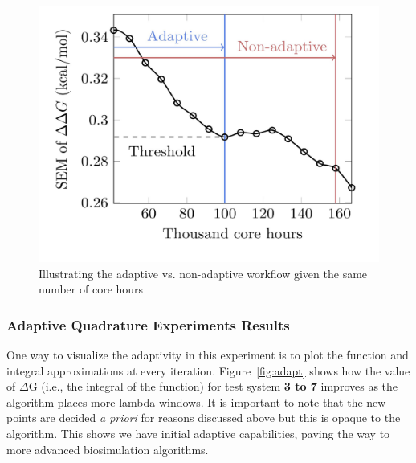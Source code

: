 
\begin{figure}
  \centering
    \includegraphics[width=\columnwidth]{figures/adaptive_vs_nonadaptive_pseudo.pdf}
    \caption{Illustrating the adaptive vs. non-adaptive workflow given the
    same number of core hours}
\label{fig:adaptive_vs_nonadaptive_TIES}
\end{figure}

\subsubsection{Adaptive Quadrature Experiments Results}


One way to visualize the adaptivity in this experiment is to plot the
function and integral approximations at every iteration.
Figure~\ref{fig:adapt} shows how the value of $\Delta$G (i.e., the integral
of the function) for test system \textbf{3 to 7}  improves as the
algorithm places more lambda windows. It is important to note that the new
points are decided {\it a priori} for reasons discussed above but this is
opaque to the algorithm. This shows we have initial adaptive capabilities,
paving the way to more advanced biosimulation algorithms.

